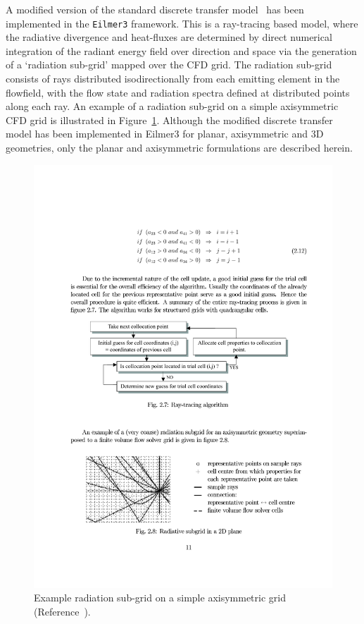 A modified version of the standard discrete transfer model~\cite{shah, elbert_cinnella, karl2001} has been implemented in the \texttt{Eilmer3}  framework.
This is a ray-tracing based model, where the radiative divergence and heat-fluxes are determined by direct numerical integration of the radiant energy field over direction and space via the generation of a `radiation sub-grid' mapped over the CFD grid.
The radiation sub-grid consists of rays distributed isodirectionally from each emitting element in the flowfield, with the flow state and radiation spectra defined at distributed points along each ray.
An example of a radiation sub-grid on a simple axisymmetric CFD grid is illustrated in Figure~\ref{fig:radiation-subgrid}.
Although the modified discrete transfer model has been implemented in Eilmer3  for planar, axisymmetric and 3D geometries, only the planar and axisymmetric formulations are described herein.

\begin{figure}[ht]
\includegraphics[width=\linewidth]{radiation/figures/axi-radiation-subgrid.pdf}
 \caption{Example radiation sub-grid on a simple axisymmetric grid (Reference~\cite{karl2001}).}
 \label{fig:radiation-subgrid}
\end{figure}

